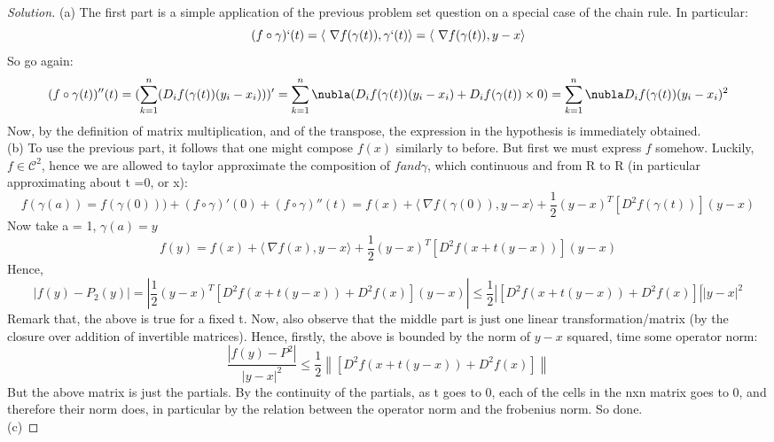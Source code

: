 \documentclass{article}
\newcommand{\norm}[1]{\left\lVert#1\right\rVert}
\newenvironment{solution}{\begin{proof}[Solution]}{\end{proof}}
\begin{document}
\begin{solution}
(a)  The first part is a simple application of the previous problem set question on a special case of the chain rule. In particular: \[
	(f\circ \gamma)`(t) = \langle\ \nabla f(\gamma (t)),\gamma	` (t) \rangle = \langle\ \nabla f(\gamma (t)), y-x \rangle 
\]
	So go again: \[
		(f \circ \gamma (t))''(t) = (\sum_{k=1}^{n} (D_{i}f(\gamma (t))(y_{i}-x_{i})))' = \sum_{k=1}^{n} \nubla (D_{i}f(\gamma (t))(y_{i}-x_{i})+D_{i}f(\gamma (t))\times 0) = \sum_{k=1}^{n} \nubla D_{i}f(\gamma (t))(y_i -x_i)^2   
	\]
	Now, by the definition of matrix multiplication, and of the transpose, the expression in the hypothesis is immediately obtained.
	\\
	(b) To use the previous part, it follows that one might compose $f(x)$ similarly to before. But first we must express $f$ somehow. Luckily, $f \in \mathscr{C}^{2}$, hence we are allowed to taylor approximate the composition of $f and \gamma $, which continuous and from R to R (in particular approximating about t =0, or x):
	\[
		f(\gamma (a)) = f(\gamma (0))) + (f \circ \gamma )' (0) + (f \circ \gamma )'' (t) = f(x) + \langle\ \nabla f(\gamma (0)), y-x \rangle +\frac{1}{2} (y-x) ^{T}\left[D^{2}f(\gamma (t))\right](y-x)
\] Now take a = 1, $\gamma (a) = y$
\[
		f(y) = f(x) +  \langle\ \nabla f(x), y-x \rangle +\frac{1}{2} (y-x) ^{T}\left[D^{2}f(x +t(y-x))\right](y-x)
	\]
Hence, \[
	|f(y) -P_{2}(y)| = \left| \frac{1}{2}(y-x)^{T}\left[D^{2}f(x+t(y-x))+D^{2}f(x)\right] (y-x)\right| \leq \frac{1}{2}\left|\left[D^{2}f(x+t(y-x))+D^{2}f(x)\right] \right| \dot |y-x|^{2}
\] 
Remark that, the above is true for a fixed t. Now, also observe that the middle part is just one linear transformation/matrix (by the closure over addition of invertible matrices). Hence, firstly, the above is bounded by the norm of $y-x$ squared, time some operator norm:
\[
	\frac{|f(y)-P^{2}|}{|y-x|^{2}} \leq \frac{1}{2} \norm{\left[D^{2}f(x+t(y-x))+D^{2}f(x)\right]}  	
\] But the above matrix is just the partials. By the continuity of the partials, as t goes to 0, each of the cells in the nxn matrix goes to 0, and therefore their norm does, in particular by the relation between the operator norm and the frobenius norm. So done.
\\
(c)


\end{solution}
\end{document}
